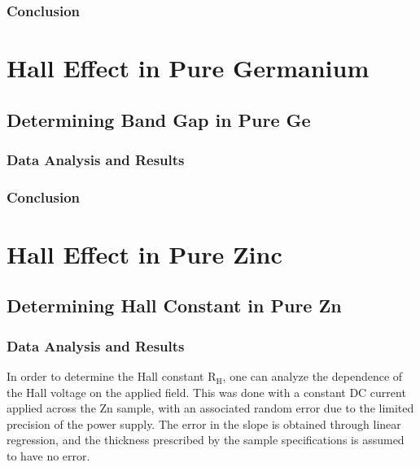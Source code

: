 \documentclass[a4paper]{article}
\begin{document}
\subsubsection{Conclusion}

\newpage

\section{Hall Effect in Pure Germanium}

\subsection{Determining Band Gap in Pure Ge}

\subsubsection{Data Analysis and Results}

\subsubsection{Conclusion}

\section{Hall Effect in Pure Zinc}

\subsection{Determining Hall Constant in Pure Zn}

\subsubsection{Data Analysis and Results}
\qq In order to determine the Hall constant $\text{R}_\text{H}$, one can
analyze the dependence of the Hall voltage on the applied field. This
was done with a constant DC current applied across the Zn sample, with
an associated random error due to the limited precision of the power
supply. The error in the slope is obtained through linear regression,
and the thickness prescribed by the sample specifications is assumed
to have no error.
\end{document}
